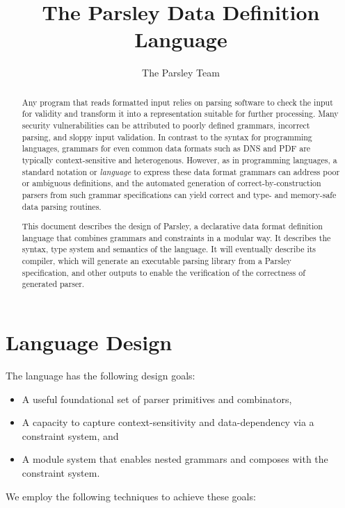 \documentclass[letterpaper]{article}
\title{The Parsley Data Definition Language}
\author{The Parsley Team}
\begin{document}
\maketitle

\begin{abstract}
  Any program that reads formatted input relies on parsing software to
  check the input for validity and transform it into a representation
  suitable for further processing.  Many security vulnerabilities can
  be attributed to poorly defined grammars, incorrect parsing, and
  sloppy input validation.  In contrast to the syntax for programming
  languages, grammars for even common data formats such as DNS and PDF
  are typically context-sensitive and heterogenous.  However, as in
  programming languages, a standard notation or {\em language} to
  express these data format grammars can address poor or ambiguous
  definitions, and the automated generation of correct-by-construction
  parsers from such grammar specifications can yield correct and type-
  and memory-safe data parsing routines.

  This document describes the design of Parsley, a declarative data
  format definition language that combines grammars and constraints in
  a modular way.  It describes the syntax, type system and semantics
  of the language.  It will eventually describe its compiler, which
  will generate an executable parsing library from a Parsley
  specification, and other outputs to enable the verification of the
  correctness of generated parser.
\end{abstract}

\section{Language Design}
\label{s:design}

The language has the following design goals:

\begin{itemize}
\item A useful foundational set of parser primitives and combinators,
\item A capacity to capture context-sensitivity and data-dependency
  via a constraint system, and
\item  A module system that enables nested grammars and composes with
  the constraint system.
\end{itemize}

We employ the following techniques to achieve these goals:
\end{document}
